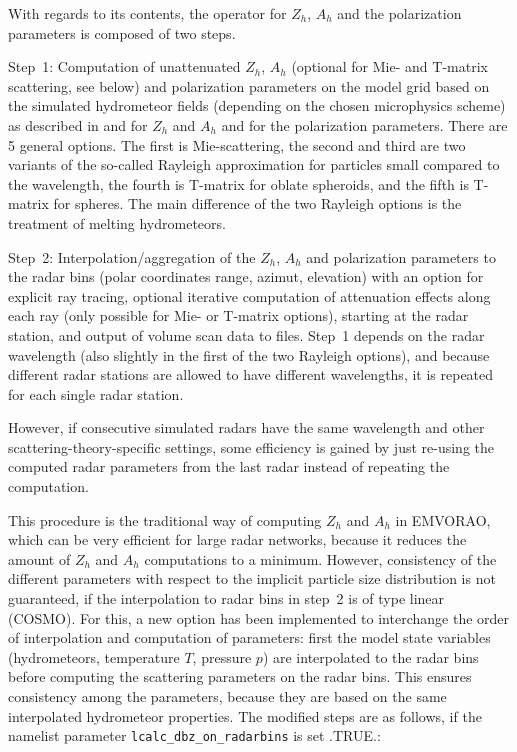 \documentclass[10pt,a4paper,twoside,headinclude,footinclude,parskip=half]{scrartcl}
\newcommand{\citeP}[1]{\citet{#1}}
\newcommand{\paramform}[1]{\mbox{\texttt{#1}}\xspace}%
\begin{document}
With regards to its contents, the operator for $Z_h$, $A_h$ and the polarization parameters is composed of two steps.

Step~1: Computation of unattenuated $Z_h$, $A_h$ (optional for Mie- and T-matrix scattering, see below) and polarization parameters
on the model grid based on the simulated hydrometeor fields (depending on the chosen
microphysics scheme) as described in \citeP{blahak2016a} and \citeP{zeng2016a} for $Z_h$ and $A_h$ and \citeP{ryzhkov2011} for the polarization parameters.
There are 5 general options. The first is Mie-scattering, the second and third are two
variants of the so-called Rayleigh approximation for particles small compared to the wavelength, the fourth is T-matrix for oblate spheroids, and the fifth is T-matrix for spheres.
The main difference of the two Rayleigh options is the treatment of melting hydrometeors.

Step~2: Interpolation/aggregation of the $Z_h$, $A_h$ and polarization parameters to the
radar bins (polar coordinates range, azimut, elevation) with an option for explicit ray tracing, optional iterative computation
of attenuation effects along each ray (only possible for Mie- or T-matrix options), starting at the radar station, and output of volume
scan data to files. Step~1 depends on the radar wavelength (also slightly in the first of the two Rayleigh options), and because different
radar stations are allowed to have different wavelengths, it is repeated for each single
radar station.

However, if consecutive simulated radars have the same wavelength and other scattering-theory-specific
settings, some efficiency is gained
by just re-using the computed radar parameters from the last radar instead of repeating the computation.

This procedure is the traditional way of computing $Z_h$ and $A_h$ in EMVORAO, which can be very efficient for large radar networks, because it
reduces the amount of $Z_h$ and $A_h$ computations to a minimum. However, consistency of the different parameters with respect to the implicit particle size distribution is not guaranteed,
if the interpolation to radar bins in step~2 is of type linear (COSMO).
For this, a new option has been implemented to interchange the order of interpolation and computation of parameters:
first the model state variables (hydrometeors, temperature $T$, pressure $p$) are interpolated to the radar bins before computing the scattering parameters on the radar bins.
This ensures consistency among the parameters, because they are based on the same interpolated hydrometeor properties. The modified steps
are as follows, if the namelist parameter \paramform{lcalc_dbz_on_radarbins} is set .TRUE.:
\end{document}
